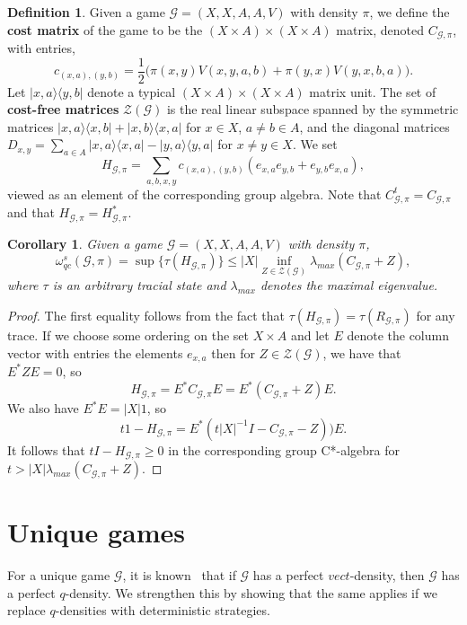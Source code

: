 \documentclass[11pt]{amsart}
\newtheorem{cor}[thm]{Corollary}
\theoremstyle{definition}
\newtheorem{defn}[thm]{Definition}
\newcommand{\cl}[1]{\mathcal{#1}}
\begin{document}
\begin{defn} Given a game $\cl G=(X, X, A, A, V)$ with density $\pi$, we define the {\bf cost matrix} of the game to be the $(X \times A) \times (X \times A)$ matrix, denoted $C_{\cl G, \pi}$, with entries,
  \[ c_{(x,a), (y,b)} =  \frac{1}{2}\big( \pi(x,y)V(x,y,a,b) + \pi(y,x) V(y,x,b,a) \big).\]
Let $|x,a\rangle\langle y,b|$ denote a typical $(X\times A)\times (X\times A)$ matrix unit.  The set of {\bf cost-free matrices} $\cl Z(\cl G)$ is the real linear subspace spanned by the symmetric matrices $|x,a\rangle\langle x,b|+|x,b\rangle\langle x,a|$ for $x\in X$, $a\ne b\in A$, and the diagonal matrices $D_{x,y}=\sum_{a\in A}|x,a\rangle\langle x,a|-|y,a\rangle\langle y,a|$ for $x\ne y\in X$.
We set
\[ H_{\cl G, \pi} = \sum_{a,b,x,y} c_{(x,a),(y,b)}(e_{x,a}e_{y,b} + e_{y,b} e_{x,a}),\]
viewed as an element of the corresponding group algebra.
Note that $C_{\cl G, \pi}^t = C_{\cl G, \pi}$ and that $H_{\cl G, \pi} = H_{\cl G, \pi}^*$.
\end{defn}

 \begin{cor}\label{cor:cost-matrix} Given a game $\cl G=(X, X, A, A, V)$ with density $\pi$,
 \[ \omega^s_{qc}(\cl G, \pi) = \sup \{ \tau( H_{\cl G, \pi}) \} \le |X|\inf_{Z\in \cl Z(\cl G)} \lambda_{max}(C_{\cl G, \pi}+Z),\]
 where $\tau$ is an arbitrary tracial state and $\lambda_{max}$ denotes the maximal eigenvalue.%
 \end{cor}
 \begin{proof} The first equality follows from the fact that $\tau(H_{\cl G, \pi}) = \tau(R_{\cl G, \pi})$ for any trace.
 If we choose some ordering on the set $X \times A$ and let $E$ denote the column vector with entries the elements $e_{x,a}$ then for $Z\in \cl Z(\cl G)$, we have that $E^*ZE=0$, so
 \[ H_{\cl G, \pi} = E^*C_{\cl G,\pi}E=E^* (C_{\cl G, \pi}+Z) E.\]
 We also have $E^*E=|X|1$, so
 \[t1-H_{\cl G,\pi}=E^*(t|X|^{-1}I-C_{\cl G,\pi}-Z))E.\]
It follows that $tI - H_{\cl G, \pi} \ge 0$ in the corresponding group C*-algebra for
 $t > |X|\lambda_{max}(C_{\cl G, \pi}+Z).$
 \end{proof}

\section{Unique games}

For a unique game $\cl G$, it is known~\cite{KRT} that if $\cl G$ has a perfect $vect$-density, then $\cl G$ has a perfect $q$-density.  We strengthen this by showing that the same applies if we replace $q$-densities with deterministic strategies.
\end{document}
